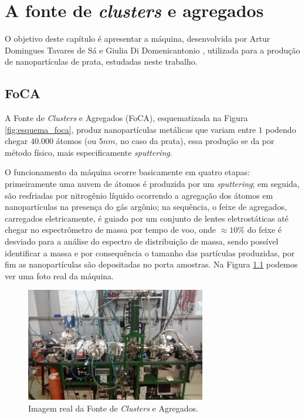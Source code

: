 \chapter{A fonte de \textit{clusters} e agregados}
\label{c3}

O objetivo deste capítulo é apresentar a máquina, desenvolvida por Artur Domingues Tavares de Sá e Giulia Di Domenicantonio \cite{tese_artur}, utilizada para a produção de nanopartículas de prata, estudadas neste trabalho.

\section{FoCA}

A Fonte de \textit{Clusters} e Agregados (FoCA), esquematizada na Figura \ref{fig:esquema_foca}, produz nanopartículas metálicas que variam entre $1$ podendo chegar $40.000$ átomos (ou $5nm$, no caso da prata), essa produção se da por método físico, mais especificamente \textit{sputtering}.

O funcionamento da máquina ocorre basicamente em quatro etapas: primeiramente uma nuvem de átomos é produzida por um \textit{sputtering}; em seguida, são resfriadas por nitrogênio líquido ocorrendo a agregação dos átomos em nanopartículas na presença do gás argônio; na sequência, o feixe de agregados, carregados eletricamente, é guiado por um conjunto de lentes eletrostáticas até chegar no espectrômetro de massa por tempo de voo, onde $\approx10\%$ do feixe é desviado para a análise do espectro de distribuição de massa, sendo possível identificar a massa e por consequência o tamanho das partículas produzidas, por fim as nanopartículas são depositadas no porta amostras. Na Figura \ref{fig:foto_foca} podemos ver uma foto real da máquina. 

\begin{figure}
  \centering
  \includegraphics[width=0.7\textwidth]{images/foto_foca}
  \caption{ Imagem real da  Fonte de \textit{Clusters} e Agregados.  }
  \label{fig:foto_foca}
\end{figure}

